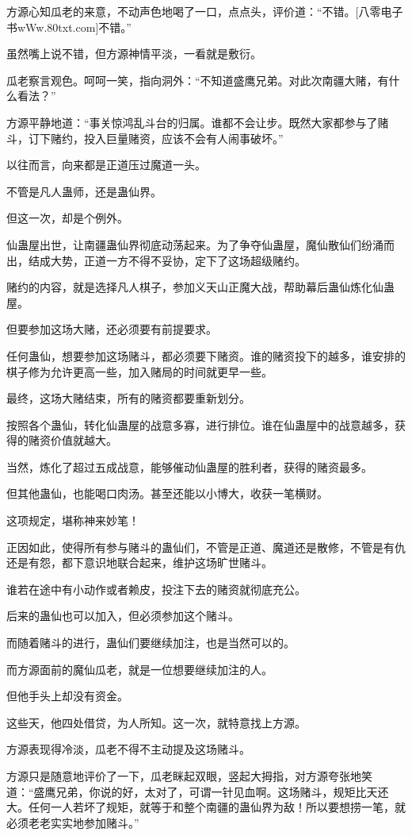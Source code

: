 \begin{this_body}
方源心知瓜老的来意，不动声色地喝了一口，点点头，评价道：“不错。[八零电子书wWw.80txt.com]不错。”

虽然嘴上说不错，但方源神情平淡，一看就是敷衍。

瓜老察言观色。呵呵一笑，指向洞外：“不知道盛鹰兄弟。对此次南疆大赌，有什么看法？”

方源平静地道：“事关惊鸿乱斗台的归属。谁都不会让步。既然大家都参与了赌斗，订下赌约，投入巨量赌资，应该不会有人闹事破坏。”

以往而言，向来都是正道压过魔道一头。

不管是凡人蛊师，还是蛊仙界。

但这一次，却是个例外。

仙蛊屋出世，让南疆蛊仙界彻底动荡起来。为了争夺仙蛊屋，魔仙散仙们纷涌而出，结成大势，正道一方不得不妥协，定下了这场超级赌约。

赌约的内容，就是选择凡人棋子，参加义天山正魔大战，帮助幕后蛊仙炼化仙蛊屋。

但要参加这场大赌，还必须要有前提要求。

任何蛊仙，想要参加这场赌斗，都必须要下赌资。谁的赌资投下的越多，谁安排的棋子修为允许更高一些，加入赌局的时间就更早一些。

最终，这场大赌结束，所有的赌资都要重新划分。

按照各个蛊仙，转化仙蛊屋的战意多寡，进行排位。谁在仙蛊屋中的战意越多，获得的赌资价值就越大。

当然，炼化了超过五成战意，能够催动仙蛊屋的胜利者，获得的赌资最多。

但其他蛊仙，也能喝口肉汤。甚至还能以小博大，收获一笔横财。

这项规定，堪称神来妙笔！

正因如此，使得所有参与赌斗的蛊仙们，不管是正道、魔道还是散修，不管是有仇还是有怨，都下意识地联合起来，维护这场旷世赌斗。

谁若在途中有小动作或者赖皮，投注下去的赌资就彻底充公。

后来的蛊仙也可以加入，但必须参加这个赌斗。

而随着赌斗的进行，蛊仙们要继续加注，也是当然可以的。

而方源面前的魔仙瓜老，就是一位想要继续加注的人。

但他手头上却没有资金。

这些天，他四处借贷，为人所知。这一次，就特意找上方源。

方源表现得冷淡，瓜老不得不主动提及这场赌斗。

方源只是随意地评价了一下，瓜老眯起双眼，竖起大拇指，对方源夸张地笑道：“盛鹰兄弟，你说的好，太对了，可谓一针见血啊。这场赌斗，规矩比天还大。任何一人若坏了规矩，就等于和整个南疆的蛊仙界为敌！所以要想捞一笔，就必须老老实实地参加赌斗。”


\end{this_body}
